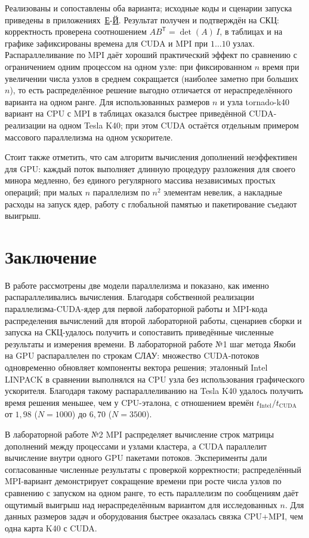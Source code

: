 \documentclass[areasetadvanced]{scrartcl}
\newcommand{\appref}[2]{\hyperref[#1]{#2}}
\begin{document}
Реализованы и сопоставлены оба варианта; исходные коды и сценарии запуска приведены в приложениях~\appref{app:t2-mpi}{Е}-\appref{app:t2-build}{Й}.
Результат получен и подтверждён на СКЦ: корректность проверена соотношением $A B^{\mathsf T} = \det(A)\,I$, в таблицах и на графике зафиксированы времена для CUDA и MPI при $1\ldots10$ узлах.
Распараллеливание по MPI даёт хороший практический эффект по сравнению с ограничением одним процессом на одном узле: при фиксированном $n$ время при увеличении числа узлов в среднем сокращается (наиболее заметно при больших $n$), то есть распределённое решение выгодно отличается от нераспределённого варианта на одном ранге.
Для использованных размеров $n$ и узла tornado-k40 вариант на CPU с MPI в таблицах оказался быстрее приведённой CUDA-реализации на одном Tesla K40; при этом CUDA остаётся отдельным примером массового параллелизма на одном ускорителе.

Стоит также отметить, что сам алгоритм вычисления дополнений неэффективен для GPU: 
каждый поток выполняет длинную процедуру разложения для своего минора медленно, 
без единого регулярного массива независимых простых операций; 
при малых $n$ параллелизм по $n^2$ элементам невелик, 
а накладные расходы на запуск ядер, работу с глобальной памятью и пакетирование съедают выигрыш.

\newpage
\section*{Заключение}

В работе рассмотрены две модели параллелизма и показано, как именно распараллеливались вычисления.
Благодаря собственной реализации параллелизма-CUDA-ядер для первой лабораторной работы и MPI-кода распределения вычислений для второй лабораторной работы, сценариев сборки и запуска на СКЦ-удалось получить и сопоставить приведённые численные результаты и измерения времени.
В лабораторной работе №1 шаг метода Якоби на GPU распараллелен по строкам СЛАУ: множество CUDA-потоков одновременно обновляет компоненты вектора решения; эталонный Intel LINPACK в сравнении выполнялся на CPU узла без использования графического ускорителя. Благодаря такому распараллеливанию на Tesla K40 удалось получить время решения меньшее, чем у CPU-эталона, с отношением времён $t_{\mathrm{Intel}}/t_{\mathrm{CUDA}}$ от $1{,}98$ ($N=1000$) до $6{,}70$ ($N=3500$).

В лабораторной работе №2 MPI распределяет вычисление строк матрицы дополнений между процессами и узлами кластера, а CUDA параллелит вычисление внутри одного GPU пакетами потоков. Эксперименты дали согласованные численные результаты с проверкой корректности; распределённый MPI-вариант демонстрирует сокращение времени при росте числа узлов по сравнению с запуском на одном ранге, то есть параллелизм по сообщениям даёт ощутимый выигрыш над нераспределённым вариантом для исследованных $n$. Для данных размеров задач и оборудования быстрее оказалась связка CPU+MPI, чем одна карта K40 с CUDA.
\end{document}
